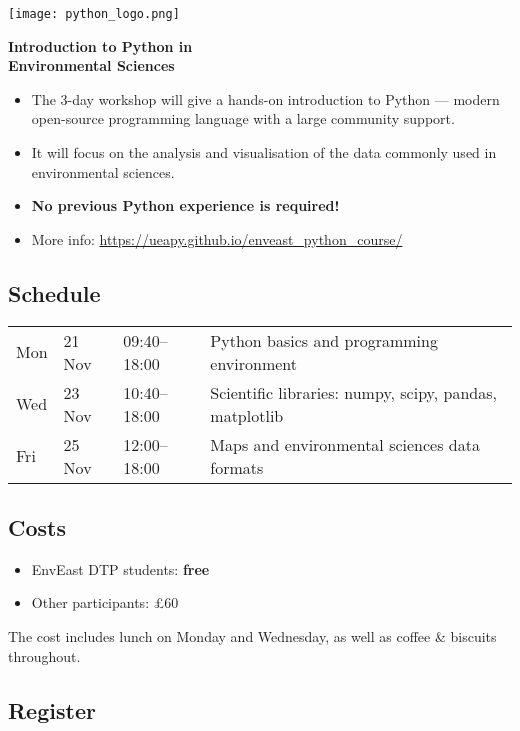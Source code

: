 \documentclass[paper=a4]{scrartcl}
\newcommand*{\pyitem}{\item [{\texttt{[image: python\_logo.png]}}]}
\begin{document}
\pagestyle{empty} %

\begin{center}
\begin{minipage}{0.2\linewidth}
    \texttt{[image: python\_logo.png]}
    \vspace{0.5cm}
\end{minipage}

\Huge \textbf{Introduction to Python in \\ Environmental Sciences}

\end{center}

\begin{itemize}
\pyitem The 3-day workshop will give a hands-on introduction to Python --- modern open-source programming language with a large community support.
\pyitem It will focus on the analysis and visualisation of the data commonly used in environmental sciences.
\pyitem \textbf{No previous Python experience is required!}
\pyitem More info: \url{https://ueapy.github.io/enveast_python_course/}
\end{itemize}


\subsection*{Schedule}
\begin{center}
\begin{tabular}{llll}
Mon & 21 Nov & 09:40--18:00 & Python basics and programming environment\\
Wed & 23 Nov & 10:40--18:00 & Scientific libraries: numpy, scipy, pandas, matplotlib \\
Fri & 25 Nov & 12:00--18:00 & Maps and environmental sciences data formats\\
\end{tabular}
\end{center}


\subsection*{Costs}
\begin{itemize}
\pyitem EnvEast DTP students: \textbf{free}
\pyitem Other participants: \pounds 60
\end{itemize}
\vspace{-0.5cm}
\scriptsize The cost includes lunch on Monday and Wednesday, as well as coffee \& biscuits throughout. \normalsize

\subsection*{Register}
\end{document}
